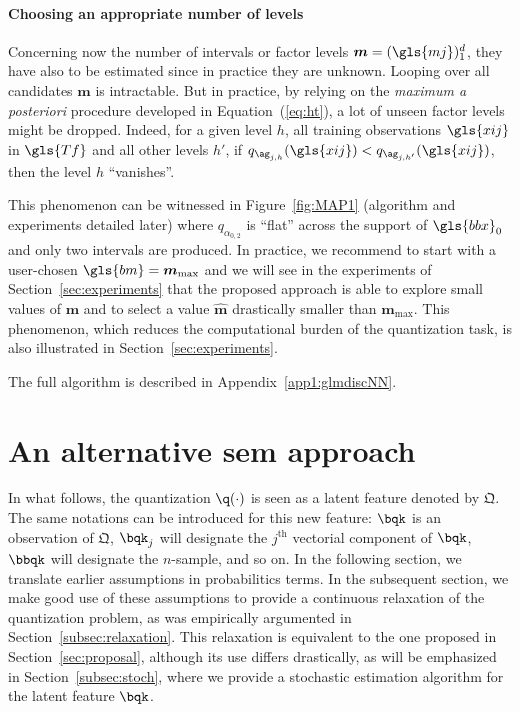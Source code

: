  
\paragraph{Choosing an appropriate number of levels}

Concerning now the number of intervals or factor levels $\boldsymbol{m} = (\gls{mj})_1^d$, they have also to be estimated since in practice they are unknown. Looping over all candidates $\boldsymbol{m}$ is intractable. But in practice, by relying on the \textit{maximum a posteriori} procedure developed in Equation~(\ref{eq:ht}), a lot of unseen factor levels might be dropped. Indeed, for a given level $h$, all training observations $\gls{xij}$ in $\gls{Tf}$ and all other levels $h'$, if $q_{\ag_{j,h}}(\gls{xij}) < q_{\ag_{j,h'}}(\gls{xij})$, then the level $h$ ``vanishes''.

This phenomenon can be witnessed in Figure~\ref{fig:MAP1} (algorithm and experiments detailed later) where $q_{\alpha_{0,2}}$ is ``flat'' across the support of $\gls{bbx}_0$ and only two intervals are produced. In practice, we recommend to start with a user-chosen $\gls{bm}=\boldsymbol{m}_{\max}$ and we will see in the experiments of Section~\ref{sec:experiments} that the proposed approach is able to explore small values of $\boldsymbol{m}$ and to select a value $\hat{\boldsymbol{m}}$ drastically smaller than $\boldsymbol{m}_{\max}$. This phenomenon, which reduces the computational burden of the quantization task, is also illustrated in Section~\ref{sec:experiments}.

The full algorithm is described in Appendix~\ref{app1:glmdiscNN}.


\section{An alternative \gls{sem} approach} \label{sec:sem}
 
 
In what follows, the quantization $\q(\cdot)$ is seen as a latent feature denoted by $\bm{\mathfrak{Q}}$. The same notations can be introduced for this new feature:  $\bqk$ is an observation of $\bm{\mathfrak{Q}}$, $\bqk_j$ will designate the $j^{\text{th}}$ vectorial component of $\bqk$, $\bbqk$ will designate the $n$-sample, and so on. In the following section, we translate earlier assumptions in probabilitics terms. In the subsequent section, we make good use of these assumptions to provide a continuous relaxation of the quantization problem, as was empirically argumented in Section~\ref{subsec:relaxation}. This relaxation is equivalent to the one proposed in Section~\ref{sec:proposal}, although its use differs drastically, as will be emphasized in Section~\ref{subsec:stoch}, where we provide a stochastic estimation algorithm for the latent feature $\bqk$.

